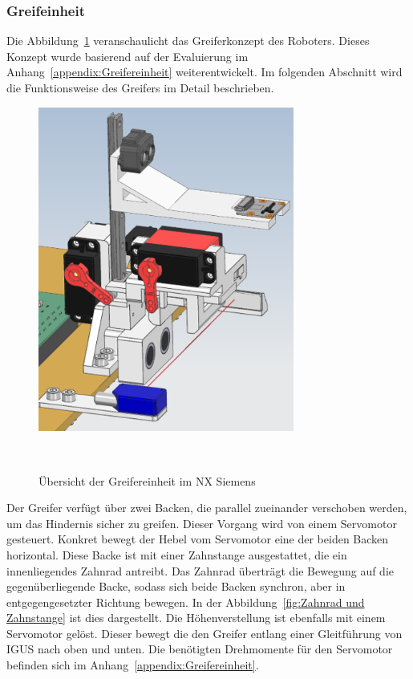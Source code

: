 \documentclass[main.tex]{subfiles} %
\begin{document}

\subsubsection{Greifeinheit}


Die Abbildung~\ref{fig:Greifereinheit} veranschaulicht das Greiferkonzept des Roboters. Dieses Konzept wurde basierend auf der Evaluierung 
im Anhang~\ref{appendix:Greifereinheit} weiterentwickelt. Im folgenden Abschnitt wird die Funktionsweise des Greifers im Detail beschrieben.

\begin{figure}[H]
    \centering
    \includegraphics[width=0.75\textwidth]{Greifereinheit_Uebersicht.png}
    \caption{Übersicht der Greifereinheit im NX Siemens}~\label{fig:Greifereinheit}
\end{figure}

Der Greifer verfügt über zwei Backen, die parallel zueinander verschoben werden, um das Hindernis sicher zu greifen. 
Dieser Vorgang wird von einem Servomotor gesteuert. Konkret bewegt der Hebel vom Servomotor eine der beiden Backen horizontal. 
Diese Backe ist mit einer Zahnstange ausgestattet, die ein innenliegendes Zahnrad antreibt. Das Zahnrad überträgt die 
Bewegung auf die gegenüberliegende Backe, sodass sich beide Backen synchron, aber in entgegengesetzter Richtung bewegen.
In der Abbildung~\ref{fig:Zahnrad und Zahnstange} ist dies dargestellt. Die Höhenverstellung ist ebenfalls mit einem Servomotor gelöst.
Dieser bewegt die den Greifer entlang einer Gleitführung von IGUS nach oben und unten. Die benötigten Drehmomente für den Servomotor
befinden sich im Anhang~\ref{appendix:Greifereinheit}.
\end{document}
